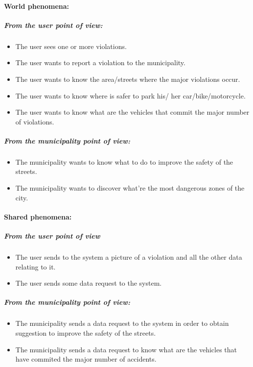 \documentclass[titlepage]{article}
\begin{document}
\paragraph{World phenomena: }
\subparagraph{From the user point of view: }
\begin{itemize}	
	\item The user sees one or more violations.
	\item The user wants to report a violation to the 					  municipality.
	\item The user wants to know the area/streets where the 
	     major violations occur.
	\item The user wants to know where is safer to park his/			  her car/bike/motorcycle.
	\item The user wants to know what are the vehicles that       		  commit the major number of violations.

\end{itemize}
\subparagraph{From the municipality point of view: }

\begin{itemize}
	\item The municipality wants to know what to do to 				improve the safety of the streets.
	\item The municipality wants to discover what're the most
	dangerous zones of the city.\\
\end{itemize}
 
\paragraph{Shared phenomena: }
\subparagraph{From the user point of view}
 \begin{itemize}
 	\item The user sends to the system a picture of a            	violation and all the other data relating to it.
 	\item The user sends some data request to the system.
 \end{itemize}
\subparagraph{From the municipality point of view: }
\begin{itemize}
	\item The municipality sends a data request to the system 		  in order to obtain suggestion to improve the safety 		  of the streets.
	\item The municipality sends a data request to know what 			  are the vehicles that have commited the major 				  number of accidents.
\end{itemize}
\end{document}
